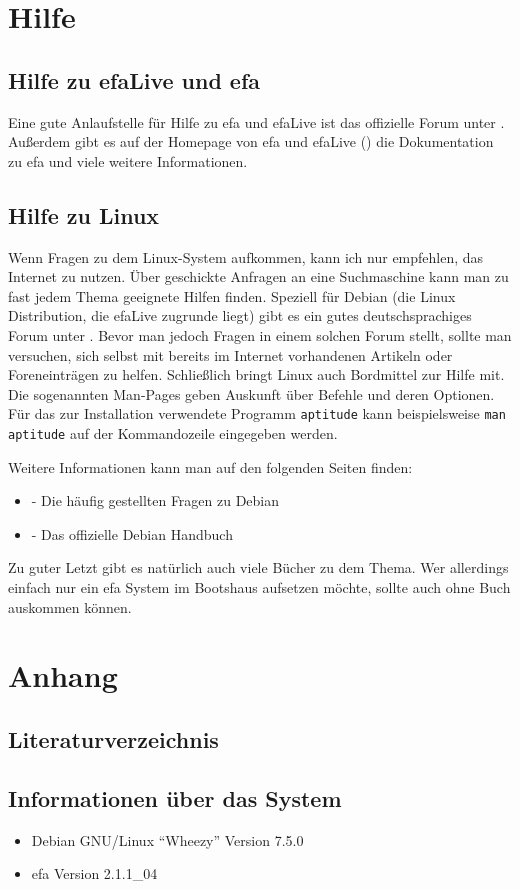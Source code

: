 \documentclass[a4paper,12pt,twoside]{article}
\begin{document}
\section{Hilfe}
\label{sct:hilfe}
\subsection{Hilfe zu efaLive und efa}
\label{sct:hilfe_efa}
Eine gute Anlaufstelle für Hilfe zu efa und efaLive ist das offizielle
Forum unter \cite{EFA3}. Außerdem gibt es auf der Homepage von efa und
efaLive (\cite{EFA1}\cite{EFA4}\cite{EFA5}) die Dokumentation zu efa
und viele weitere Informationen.


\subsection{Hilfe zu Linux}
\label{sct:hilfe_linux}
Wenn Fragen zu dem Linux-System aufkommen, kann ich nur empfehlen, das
Internet zu nutzen. Über geschickte Anfragen an eine Suchmaschine kann
man zu fast jedem Thema geeignete Hilfen finden. Speziell für Debian
(die Linux Distribution, die efaLive zugrunde liegt) gibt es ein gutes
deutschsprachiges Forum unter \cite{HLP1}. Bevor man jedoch Fragen in
einem solchen Forum stellt, sollte man versuchen, sich selbst mit
bereits im Internet vorhandenen Artikeln oder Foreneinträgen zu helfen.
Schließlich bringt Linux auch Bordmittel zur Hilfe mit. Die sogenannten
Man-Pages geben Auskunft über Befehle und deren Optionen. Für das zur
Installation verwendete Programm \texttt{aptitude}
kann beispielsweise \texttt{man aptitude} auf der
Kommandozeile eingegeben werden.

Weitere Informationen kann man auf den folgenden Seiten finden:

\begin{itemize}
    \item \cite{HLP2} - Die häufig gestellten Fragen zu Debian
    \item \cite{HLP3} - Das offizielle Debian Handbuch
\end{itemize}

Zu guter Letzt gibt es natürlich auch viele Bücher zu dem Thema. Wer
allerdings einfach nur ein efa System im Bootshaus aufsetzen möchte,
sollte auch ohne Buch auskommen können.


\clearpage
\section{Anhang}
\label{sct:anhang}
\subsection{Literaturverzeichnis}
\label{sct:literatur}




\subsection{Informationen über das System}
\label{sct:sysinfo}

\begin{itemize}
    \item Debian GNU/Linux "`Wheezy"' Version 7.5.0
    \item efa Version 2.1.1\_04
\end{itemize}
\end{document}
